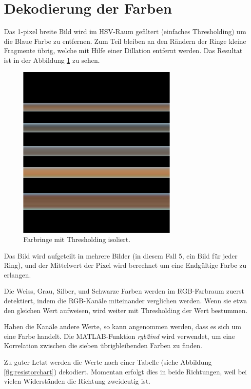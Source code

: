 \section{Dekodierung der Farben}

Das 1-pixel breite Bild wird im HSV-Raum gefiltert (einfaches Thresholding) um
die Blaue Farbe zu entfernen. Zum Teil bleiben  an  den  R\"andern  der  Ringe
kleine Fragmente \"ubrig,  welche  mit  Hilfe einer Dillation entfernt werden.
Das Resultat ist in der Abbildung \ref{fig:9} zu sehen.

\begin{figure}[H]
    \centering
    \includegraphics[width=.4\linewidth]{images/9}
    \caption{Farbringe mit Thresholding isoliert.}
    \label{fig:9}
\end{figure}

Das Bild wird aufgeteilt in mehrere Bilder (in diesem  Fall  5, ein Bild f\"ur
jeder Ring), und der Mittelwert  der Pixel wird berechnet um eine Endg\"ultige
Farbe zu erlangen.

Die Weiss, Grau, Silber, und Schwarze  Farben  werden  im  RGB-Farbraum zuerst
detektiert,  indem die RGB-Kan\"ale miteinander verglichen  werden.  Wenn  sie
etwa  den  gleichen  Wert  aufweisen, wird weiter mit  Thresholding  der  Wert
bestummen.

Haben die Kan\"ale andere Werte, so  kann  angenommen  werden, dass es sich um
eine  Farbe  handelt.  Die MATLAB-Funktion \textit{rgb2ind} wird verwendet, um
eine  Korrelation  zwischen  die sieben \"ubrigbleibenden  Farben  zu  finden.

Zu  guter   Letzt  werden  die  Werte  nach  einer  Tabelle\cite{ref:resistorcodes}  (siehe  Abbildung
\ref{fig:resistorchart}) dekodiert. Momentan erfolgt dies in beide Richtungen,
weil bei vielen Widerst\"anden die Richtung zweideutig ist.

